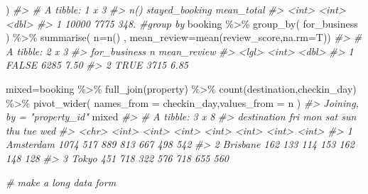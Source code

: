 \documentclass[
]{book}
\newenvironment{Shaded}{\begin{snugshade}}{\end{snugshade}}
\newcommand{\AttributeTok}[1]{\textcolor[rgb]{0.77,0.63,0.00}{#1}}
\newcommand{\CommentTok}[1]{\textcolor[rgb]{0.56,0.35,0.01}{\textit{#1}}}
\newcommand{\FunctionTok}[1]{\textcolor[rgb]{0.00,0.00,0.00}{#1}}
\newcommand{\NormalTok}[1]{#1}
\newcommand{\OtherTok}[1]{\textcolor[rgb]{0.56,0.35,0.01}{#1}}
\newcommand{\SpecialCharTok}[1]{\textcolor[rgb]{0.00,0.00,0.00}{#1}}
\begin{document}
\begin{Shaded}
\begin{Highlighting}[]
\NormalTok{  )}
\CommentTok{\#\textgreater{} \# A tibble: 1 x 3}
\CommentTok{\#\textgreater{}   \textasciigrave{}n()\textasciigrave{} stayed\_booking mean\_total}
\CommentTok{\#\textgreater{}   \textless{}int\textgreater{}          \textless{}int\textgreater{}      \textless{}dbl\textgreater{}}
\CommentTok{\#\textgreater{} 1 10000           7775       348.}
\CommentTok{\#group by}
\NormalTok{booking }\SpecialCharTok{\%\textgreater{}\%} 
  \FunctionTok{group\_by}\NormalTok{(}
\NormalTok{    for\_business}
\NormalTok{  ) }\SpecialCharTok{\%\textgreater{}\%} 
  \FunctionTok{summarise}\NormalTok{(}
  \AttributeTok{n=}\FunctionTok{n}\NormalTok{()}
\NormalTok{, }\AttributeTok{mean\_review=}\FunctionTok{mean}\NormalTok{(review\_score,}\AttributeTok{na.rm=}\NormalTok{T))}
\CommentTok{\#\textgreater{} \# A tibble: 2 x 3}
\CommentTok{\#\textgreater{}   for\_business     n mean\_review}
\CommentTok{\#\textgreater{}   \textless{}lgl\textgreater{}        \textless{}int\textgreater{}       \textless{}dbl\textgreater{}}
\CommentTok{\#\textgreater{} 1 FALSE         6285        7.50}
\CommentTok{\#\textgreater{} 2 TRUE          3715        6.85}

\NormalTok{mixed}\OtherTok{=}\NormalTok{booking }\SpecialCharTok{\%\textgreater{}\%} 
  \FunctionTok{full\_join}\NormalTok{(property) }\SpecialCharTok{\%\textgreater{}\%} 
  \FunctionTok{count}\NormalTok{(destination,checkin\_day) }\SpecialCharTok{\%\textgreater{}\%} 
  \FunctionTok{pivot\_wider}\NormalTok{(}
    \AttributeTok{names\_from =}\NormalTok{ checkin\_day,}\AttributeTok{values\_from =}\NormalTok{ n}
\NormalTok{  )}
\CommentTok{\#\textgreater{} Joining, by = "property\_id"}
\NormalTok{mixed }
\CommentTok{\#\textgreater{} \# A tibble: 3 x 8}
\CommentTok{\#\textgreater{}   destination   fri   mon   sat   sun   thu   tue   wed}
\CommentTok{\#\textgreater{}   \textless{}chr\textgreater{}       \textless{}int\textgreater{} \textless{}int\textgreater{} \textless{}int\textgreater{} \textless{}int\textgreater{} \textless{}int\textgreater{} \textless{}int\textgreater{} \textless{}int\textgreater{}}
\CommentTok{\#\textgreater{} 1 Amsterdam    1074   517   889   813   667   498   542}
\CommentTok{\#\textgreater{} 2 Brisbane      162   133   114   153   162   148   128}
\CommentTok{\#\textgreater{} 3 Tokyo         451   718   322   576   718   655   560}

\CommentTok{\# make a long data form}


\end{Highlighting}
\end{Shaded}
\end{document}
